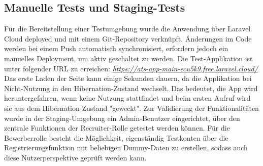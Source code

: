 \subsection{Manuelle Tests und Staging-Tests}
Für die Bereitstellung einer Testumgebung wurde die Anwendung über Laravel Cloud deployed und mit einem Git-Repository verknüpft. 
Änderungen im Code werden bei einem Push automatisch synchronisiert, erfordern jedoch ein manuelles Deployment, um aktiv geschaltet zu werden.
Die Test-Applikation ist unter folgender URL zu erreichen: \textit{\url{https://ats-app-main-ecu5k9.free.laravel.cloud/}}
Das erste Laden der Seite kann einige Sekunden dauern, da die Applikation bei Nicht-Nutzung in den Hibernation-Zustand wechselt. 
Das bedeutet, die App wird heruntergefahren, wenn keine Nutzung stattfindet und beim ersten Aufruf wird sie aus dem Hibernation-Zustand "geweckt".
\newline
Zur Validierung der Funktionalitäten wurde in der Staging-Umgebung ein Admin-Benutzer eingerichtet, über den zentrale Funktionen der Recruiter-Rolle getestet werden können. 
Für die Bewerberrolle besteht die Möglichkeit, eigenständig Testkonten über die Registrierungsfunktion mit beliebigen Dummy-Daten zu erstellen, sodass auch diese Nutzerperspektive geprüft werden kann.
